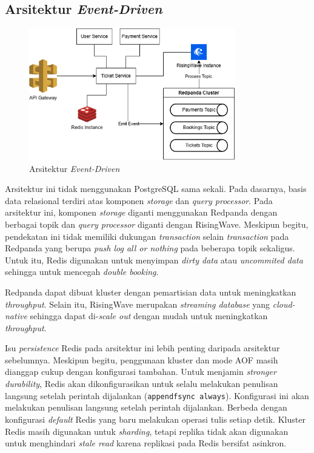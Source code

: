 \subsection{Arsitektur \textit{Event-Driven}}

\begin{figure}[htbp]
    \centering
    \includegraphics[width=0.8\textwidth]{resources/chapter-3/architecture-event-driven.png}
    \caption{Arsitektur \textit{Event-Driven}}
    \label{fig:solution-event-driven-architecture}
\end{figure}

Arsitektur ini tidak menggunakan PostgreSQL sama sekali. Pada dasarnya, basis data relasional terdiri atas komponen \textit{storage} dan \textit{query processor}. Pada arsitektur ini, komponen \textit{storage} diganti menggunakan Redpanda dengan berbagai topik dan \textit{query processor} diganti dengan RisingWave. Meskipun begitu, pendekatan ini tidak memiliki dukungan \textit{transaction} selain \textit{transaction} pada Redpanda yang berupa \textit{push log all or nothing} pada beberapa topik sekaligus. Untuk itu, Redis digunakan untuk menyimpan \textit{dirty data} atau \textit{uncommited data} sehingga untuk mencegah \textit{double booking}.

Redpanda dapat dibuat kluster dengan pemartisian data untuk meningkatkan \textit{throughput}. Selain itu, RisingWave merupakan \textit{streaming database} yang \textit{cloud-native} sehingga dapat di-\textit{scale out} dengan mudah untuk meningkatkan \textit{throughput}.

Isu \textit{persistence} Redis pada arsitektur ini lebih penting daripada arsitektur sebelumnya. Meskipun begitu, penggunaan kluster dan mode AOF masih dianggap cukup dengan konfigurasi tambahan. Untuk menjamin \textit{stronger durability}, Redis akan dikonfigurasikan untuk selalu melakukan penulisan langsung setelah perintah dijalankan (\texttt{appendfsync always}). Konfigurasi ini akan melakukan penulisan langsung setelah perintah dijalankan. Berbeda dengan konfigurasi \textit{default} Redis yang baru melakukan operasi tulis setiap detik. Kluster Redis masih digunakan untuk \textit{sharding}, tetapi replika tidak akan digunakan untuk menghindari \textit{stale read} karena replikasi pada Redis bersifat asinkron.

